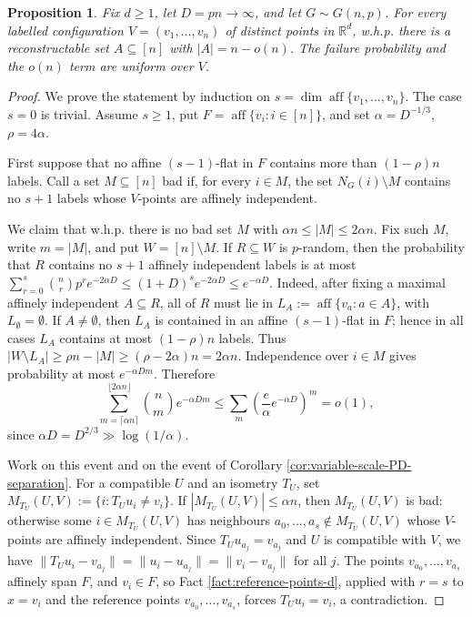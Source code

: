 \documentclass[fullpage,11pt]{article}
\providecommand{\aff}{\operatorname{aff}}
\theoremstyle{break}
\newtheorem{proposition}[theorem]{Proposition}
\theoremstyle{definition}
\theoremstyle{break}
\begin{document}
\begin{proposition}\label{prop:partial-reconstruction-upper}
Fix \(d\ge1\), let \(D=pn\to\infty\), and let \(G\sim G(n,p)\). For every
labelled configuration \(V=(v_1,\ldots,v_n)\) of distinct points in
\(\mathbb R^d\), w.h.p. there is a reconstructable set \(A\subseteq[n]\) with
\(|A|=n-o(n)\). The failure probability and the \(o(n)\) term are uniform
over \(V\).
\end{proposition}

\begin{proof}
We prove the statement by induction on
\(s=\dim\aff\{v_1,\ldots,v_n\}\). The case \(s=0\) is trivial. Assume
\(s\ge1\), put \(F=\aff\{v_i:i\in[n]\}\), and set
\(\alpha=D^{-1/3}\), \(\rho=4\alpha\).

First suppose that no affine \((s-1)\)-flat in \(F\) contains more than
\((1-\rho)n\) labels. Call a set \(M\subseteq[n]\) bad if, for every
\(i\in M\), the set \(N_G(i)\setminus M\) contains no \(s+1\) labels whose
\(V\)-points are affinely independent.

We claim that w.h.p. there is no bad set \(M\) with
\(\alpha n\le |M|\le2\alpha n\). Fix such \(M\), write \(m=|M|\), and put
\(W=[n]\setminus M\). If \(R\subseteq W\) is \(p\)-random, then the probability
that \(R\) contains no \(s+1\) affinely independent labels is at most
\(\sum_{r=0}^{s}\binom nr p^r e^{-2\alpha D}\le (1+D)^s e^{-2\alpha D}\le
e^{-\alpha D}\). Indeed, after fixing a maximal affinely independent
\(A\subseteq R\), all of \(R\) must lie in
\(L_A:=\aff\{v_a:a\in A\}\), with \(L_\emptyset=\emptyset\). If
\(A\ne\emptyset\), then \(L_A\) is contained in an affine \((s-1)\)-flat in
\(F\); hence in all cases \(L_A\) contains at most \((1-\rho)n\) labels. Thus
\(|W\setminus L_A|\ge \rho n-|M|\ge(\rho-2\alpha)n=2\alpha n\).
Independence over \(i\in M\) gives probability at most \(e^{-\alpha Dm}\).
Therefore
\[
        \sum_{m=\lceil\alpha n\rceil}^{\lfloor2\alpha n\rfloor}
        \binom nm e^{-\alpha Dm}
        \le
        \sum_m\left(\frac e\alpha e^{-\alpha D}\right)^m=o(1),
\]
since \(\alpha D=D^{2/3}\gg\log(1/\alpha)\).

Work on this event and on the event of Corollary
\ref{cor:variable-scale-PD-separation}. For a compatible \(U\) and an
isometry \(T_U\), set \(M_{T_U}(U,V):=\{i:T_Uu_i\ne v_i\}\). If
\(|M_{T_U}(U,V)|\le\alpha n\), then \(M_{T_U}(U,V)\) is bad: otherwise some
\(i\in M_{T_U}(U,V)\) has neighbours \(a_0,\ldots,a_s\notin M_{T_U}(U,V)\) whose
\(V\)-points are affinely independent. Since \(T_Uu_{a_j}=v_{a_j}\) and \(U\)
is compatible with \(V\), we have
\(\|T_Uu_i-v_{a_j}\|=\|u_i-u_{a_j}\|=\|v_i-v_{a_j}\|\) for all \(j\). The
points \(v_{a_0},\ldots,v_{a_s}\) affinely span \(F\), and \(v_i\in F\), so
Fact \ref{fact:reference-points-d}, applied with \(r=s\) to \(x=v_i\) and the
reference points \(v_{a_0},\ldots,v_{a_s}\), forces \(T_Uu_i=v_i\), a
contradiction.


\end{proof}
\end{document}
